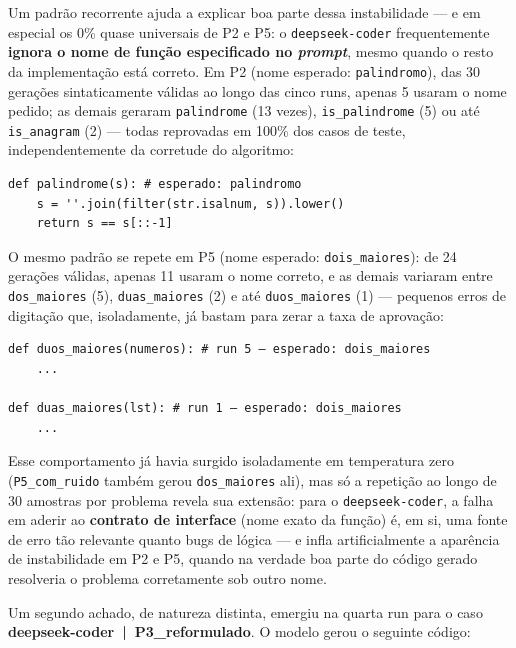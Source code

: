 \documentclass[12pt,
    english,
    french,
    spanish,
    brazil,
    ]{article}
\begin{document}
Um padrão recorrente ajuda a explicar boa parte dessa instabilidade — e em especial os 0\% quase universais de P2 e P5: o \texttt{deepseek-coder} frequentemente \textbf{ignora o nome de função especificado no \textit{prompt}}, mesmo quando o resto da implementação está correto. Em P2 (nome esperado: \texttt{palindromo}), das 30 gerações sintaticamente válidas ao longo das cinco runs, apenas 5 usaram o nome pedido; as demais geraram \texttt{palindrome} (13 vezes), \texttt{is\_palindrome} (5) ou até \texttt{is\_anagram} (2) — todas reprovadas em 100\% dos casos de teste, independentemente da corretude do algoritmo:

\begin{lstlisting}[style=python, caption={deepseek-coder em P2\_original (run 3) — lógica correta, nome de função errado (0\%)}]
def palindrome(s): # esperado: palindromo
    s = ''.join(filter(str.isalnum, s)).lower()
    return s == s[::-1]
\end{lstlisting}

O mesmo padrão se repete em P5 (nome esperado: \texttt{dois\_maiores}): de 24 gerações válidas, apenas 11 usaram o nome correto, e as demais variaram entre \texttt{dos\_maiores} (5), \texttt{duas\_maiores} (2) e até \texttt{duos\_maiores} (1) — pequenos erros de digitação que, isoladamente, já bastam para zerar a taxa de aprovação:

\begin{lstlisting}[style=python, caption={deepseek-coder em P5\_vago (run 5) e P5\_com\_ruido (run 1) — variações no nome de "dois\_maiores" (0\% em ambos)}]
def duos_maiores(numeros): # run 5 — esperado: dois_maiores
    ...

def duas_maiores(lst): # run 1 — esperado: dois_maiores
    ...
\end{lstlisting}

Esse comportamento já havia surgido isoladamente em temperatura zero (\texttt{P5\_com\_ruido} também gerou \texttt{dos\_maiores} ali), mas só a repetição ao longo de 30 amostras por problema revela sua extensão: para o \texttt{deepseek-coder}, a falha em aderir ao \textbf{contrato de interface} (nome exato da função) é, em si, uma fonte de erro tão relevante quanto bugs de lógica — e infla artificialmente a aparência de instabilidade em P2 e P5, quando na verdade boa parte do código gerado resolveria o problema corretamente sob outro nome.

Um segundo achado, de natureza distinta, emergiu na quarta run para o caso \textbf{deepseek-coder~|~P3\_reformulado}. O modelo gerou o seguinte código:
\end{document}
